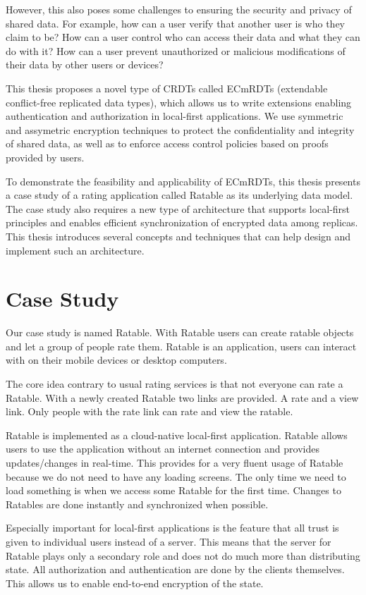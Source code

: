 \documentclass[
	ngerman,
	ruledheaders=section,   %
	class=report,		    %
	thesis={type=bachelor}, %
	accentcolor=9c,			%
	custommargins=true,    %
	marginpar=false,        %
	parskip=half-,          %
	fontsize=11pt,          %
]{tudapub}
\begin{document}
However, this also poses some challenges to ensuring the security and privacy of shared data. For example, how can a user verify that another user is who they claim to be? How can a user control who can access their data and what they can do with it? How can a user prevent unauthorized or malicious modifications of their data by other users or devices?

This thesis proposes a novel type of CRDTs called ECmRDTs (extendable conflict-free replicated data types), which allows us to write extensions enabling authentication and authorization in local-first applications. We use symmetric and assymetric encryption techniques to protect the confidentiality and integrity of shared data, as well as to enforce access control policies based on proofs provided by users. 

To demonstrate the feasibility and applicability of ECmRDTs, this thesis presents a case study of a rating application called Ratable as its underlying data model. The case study also requires a new type of architecture that supports local-first principles and enables efficient synchronization of encrypted data among replicas. This thesis introduces several concepts and techniques that can help design and implement such an architecture.

\chapter{Case Study}
Our case study is named Ratable. With Ratable users can create ratable objects and let a group of people rate them. Ratable is an application, users can interact with on their mobile devices or desktop computers. 

The core idea contrary to usual rating services is that not everyone can rate a Ratable. With a newly created Ratable two links are provided. A rate and a view link. Only people with the rate link can rate and view the ratable.

Ratable is implemented as a cloud-native local-first application. Ratable allows users to use the application without an internet connection and provides updates/changes in real-time. This provides for a very fluent usage of Ratable because we do not need to have any loading screens. The only time we need to load something is when we access some Ratable for the first time. Changes to Ratables are done instantly and synchronized when possible.

Especially important for local-first applications is the feature that all trust is given to individual users instead of a server. This means that the server for Ratable plays only a secondary role and does not do much more than distributing state. All authorization and authentication are done by the clients themselves. This allows us to enable end-to-end encryption of the state.
\end{document}
